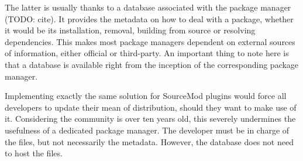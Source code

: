 The latter is usually thanks to a database associated with the package manager (TODO: cite).
It provides the metadata on how to deal with a package, whether it would be its installation, removal, building from source or resolving dependencies.
This makes most package managers dependent on external sources of information, either official or third-party.
An important thing to note here is that a database is available right from the inception of the corresponding package manager.

Implementing exactly the same solution for SourceMod plugins would force all developers to update their mean of distribution, should they want to make use of it.
Considering the community is over ten years old, this severely undermines the usefulness of a dedicated package manager.
The developer must be in charge of the files, but not necessarily the metadata.
However, the database does not need to host the files.
